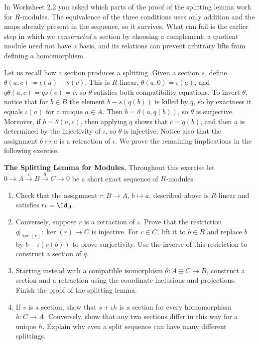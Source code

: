\documentclass[12pt,reqno]{amsart}
\begin{document}
In Worksheet 2.2 you asked which parts of the proof of the splitting lemma work for $R$-modules. The equivalence of the three conditions uses only addition and the maps already present in the sequence, so it survives. What can fail is the earlier step in which we \emph{constructed} a section by choosing a complement: a quotient module need not have a basis, and its relations can prevent arbitrary lifts from defining a homomorphism.

Let us recall how a section produces a splitting. Given a section $s$, define $\theta(a,c)\coloneqq\iota(a)+s(c)$. This is $R$-linear, $\theta(a,0)=\iota(a)$, and $q\theta(a,c)=qs(c)=c$, so $\theta$ satisfies both compatibility equations. To invert $\theta$, notice that for $b\in B$ the element $b-s(q(b))$ is killed by $q$, so by exactness it equals $\iota(a)$ for a unique $a\in A$. Then $b=\theta(a,q(b))$, so $\theta$ is surjective. Moreover, if $b=\theta(a,c)$, then applying $q$ shows that $c=q(b)$, and then $a$ is determined by the injectivity of $\iota$, so $\theta$ is injective. Notice also that the assignment $b\mapsto a$ is a retraction of $\iota$. We prove the remaining implications in the following exercise.

\hrulefill

\begin{problems}
\item\label{p:splitting} \textbf{The Splitting Lemma for Modules.} Throughout this exercise let $0\to A\xrightarrow{\iota}B\xrightarrow{q}C\to0$ be a short exact sequence of $R$-modules.
\begin{enumerate}
\item Check that the assignment $r:B\to A$, $b\mapsto a$, described above is $R$-linear and satisfies $r\iota=\Id_A$.
\item Conversely, suppose $r$ is a retraction of $\iota$. Prove that the restriction $q|_{\ker(r)}:\ker(r)\to C$ is injective. For $c\in C$, lift it to $b\in B$ and replace $b$ by $b-\iota(r(b))$ to prove surjectivity. Use the inverse of this restriction to construct a section of $q$.
\item Starting instead with a compatible isomorphism $\theta:A\oplus C\to B$, construct a section and a retraction using the coordinate inclusions and projections. Finish the proof of the splitting lemma.
\item If $s$ is a section, show that $s+\iota h$ is a section for every homomorphism $h:C\to A$. Conversely, show that any two sections differ in this way for a unique $h$. Explain why even a split sequence can have many different splittings.
\end{enumerate}
\end{problems}
\end{document}

